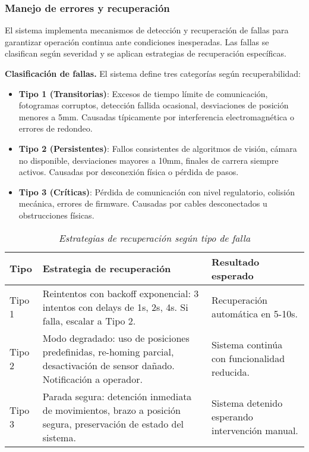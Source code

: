 \subsubsection{Manejo de errores y recuperación}

El sistema implementa mecanismos de detección y recuperación de fallas para garantizar operación continua ante condiciones inesperadas. Las fallas se clasifican según severidad y se aplican estrategias de recuperación específicas.

\textbf{Clasificación de fallas.} El sistema define tres categorías según recuperabilidad:

\begin{itemize}
    \item \textbf{Tipo 1 (Transitorias)}: Excesos de tiempo límite de comunicación, fotogramas corruptos, detección fallida ocasional, desviaciones de posición menores a 5mm. Causadas típicamente por interferencia electromagnética o errores de redondeo.

    \item \textbf{Tipo 2 (Persistentes)}: Fallos consistentes de algoritmos de visión, cámara no disponible, desviaciones mayores a 10mm, finales de carrera siempre activos. Causadas por desconexión física o pérdida de pasos.

    \item \textbf{Tipo 3 (Críticas)}: Pérdida de comunicación con nivel regulatorio, colisión mecánica, errores de firmware. Causadas por cables desconectados u obstrucciones físicas.
\end{itemize}

\begin{table}[H]
\centering
\small
\begin{tabular}{|l|p{5.5cm}|p{5.5cm}|}
\hline
\textbf{Tipo} & \textbf{Estrategia de recuperación} & \textbf{Resultado esperado} \\
\hline
Tipo 1 & Reintentos con backoff exponencial: 3 intentos con delays de 1s, 2s, 4s. Si falla, escalar a Tipo 2. & Recuperación automática en 5-10s. \\
\hline
Tipo 2 & Modo degradado: uso de posiciones predefinidas, re-homing parcial, desactivación de sensor dañado. Notificación a operador. & Sistema continúa con funcionalidad reducida. \\
\hline
Tipo 3 & Parada segura: detención inmediata de movimientos, brazo a posición segura, preservación de estado del sistema. & Sistema detenido esperando intervención manual. \\
\hline
\end{tabular}
\caption{\textit{Estrategias de recuperación según tipo de falla}}
\label{tab:estrategias_recuperacion}
\end{table}


